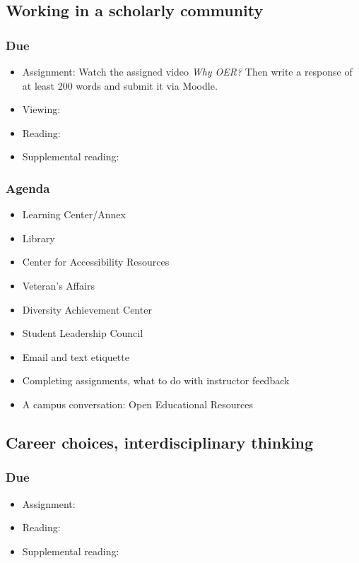 \documentclass[12pt,article,oneside]{memoir}
\begin{document}
\subsection{Working in a scholarly community}
\subsubsection{Due}
\begin{itemize}
 \item Assignment: Watch the assigned video \emph{Why OER?}  Then write a response of at least 200 words and submit it via Moodle. 
 \item Viewing: \cite{oer}
 \item Reading: \cite{wellsley}
 \item Supplemental reading: \cite{oer-dh}
\end{itemize}


\subsubsection{Agenda}
\begin{itemize}
 \item Learning Center/Annex
 \item Library
 \item Center for Accessibility Resources
 \item Veteran's Affairs
 \item Diversity Achievement Center
 \item Student Leadership Council
 \item Email and text etiquette
 \item Completing assignments, what to do with instructor feedback
 \item A campus conversation: Open Educational Resources
\end{itemize}



\subsection{Career choices, interdisciplinary thinking}
\subsubsection{Due}
\begin{itemize}
 \item Assignment: 
 \item Reading: \cite{worksheets,ooh}
 \item Supplemental reading: \cite{gen-ed}
\end{itemize}
\end{document}
